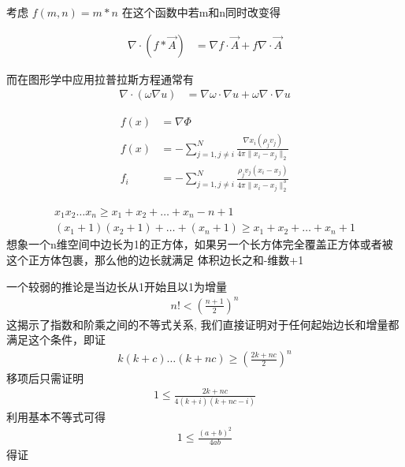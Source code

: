 \begin{thm}[乘积的Operand操作数的变化对结果的影响]
		考虑 $ f(m,n)= m*n $ 在这个函数中若m和n同时改变得
\end{thm}

\begin{thm}[向量乘积的微分法则]
		\begin{align*}
				\nabla \cdot (f*\vec A) &=\nabla f\cdot \vec A+f\nabla \cdot \vec A
		\end{align*}

		而在图形学中应用拉普拉斯方程通常有
		\begin{align*}
				\nabla \cdot (\omega \nabla u) &= \nabla \omega \cdot \nabla u + \omega\nabla \cdot  \nabla u     
		\end{align*}
\end{thm}
\begin{thm}[计算万有引力势能]
	\begin{align*}
			f(x) &=  \nabla \Phi \\
			f(x) &=  -\sum_{j=1,j\neq i}^{N}\frac{ \nabla x_i (\rho_j v_j) }{4\pi \|x_i -x_j\|_2} \\
			f_i &= - \sum_{j=1,j\neq i}^{N} \frac{\rho_j v_j(x_i-x_j)}{4\pi \|x_i-x_j\|_2^3}  
	\end{align*}	
\end{thm}
\begin{thm}[伯努利不等式(体积>=边长之和-维数+1]
	\begin{align*}
			x_1 x_2\ldots x_{n} \ge x_1+x_2+\ldots+x_{n} - n+1 \\
			(x_1+1)(x_2+1)+\ldots+(x_{n}+1) \ge x_1+x_2+\ldots+x_{n} +1
	\end{align*}	
	想象一个n维空间中边长为1的正方体，如果另一个长方体完全覆盖正方体或者被这个正方体包裹，那么他的边长就满足
	体积\ge 边长之和-维数+1
\end{thm}
\begin{thm}
		一个较弱的推论是当边长从1开始且以1为增量
	\begin{align*}
			n!<(\frac{n+1}{2} )^n 
	\end{align*}	
	这揭示了指数和阶乘之间的不等式关系,
	我们直接证明对于任何起始边长和增量都满足这个条件，即证
	\begin{align*}
		k(k+c)\ldots(k+nc)\ge (\frac{2k+nc}{2})^n
	\end{align*}
	移项后只需证明
	\begin{align*}
			1\le \frac{2k+nc }{4(k+i)(k+nc-i)} 
	\end{align*}
	利用基本不等式可得
	\begin{align*}
			1\le \frac{\left( a+b \right) ^2}{4ab} 
	\end{align*}
	得证

\end{thm}
